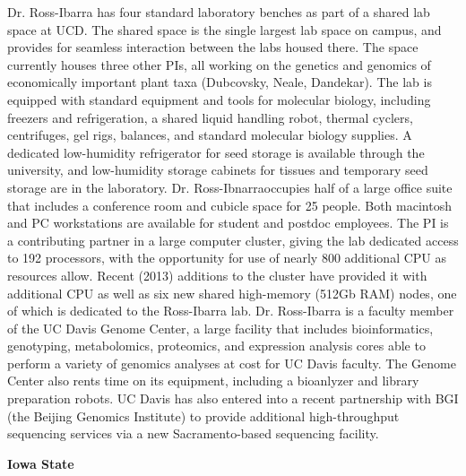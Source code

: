 Dr. Ross-Ibarra has four standard laboratory benches as part of a shared lab space at UCD.  The shared space is the single largest lab space on campus, and provides for seamless interaction between the labs housed there.  The space currently houses three other PIs, all working on the genetics and genomics of economically important plant taxa (Dubcovsky, Neale, Dandekar). The lab is equipped with standard equipment and tools for molecular biology, including freezers and refrigeration, a shared liquid handling robot, thermal cyclers, centrifuges, gel rigs, balances, and standard molecular biology supplies.  A dedicated low-humidity refrigerator for seed storage is available through the university, and low-humidity storage cabinets for tissues and temporary seed storage are in the laboratory. Dr. Ross-Ibnarraoccupies half of a large office suite that includes a conference room and cubicle space for 25 people.  Both macintosh and PC workstations are available for student and postdoc employees. The PI is a contributing partner in a large computer cluster, giving the lab dedicated access to 192 processors, with the opportunity for use of nearly 800 additional CPU as resources allow. Recent (2013) additions to the cluster have provided it with additional CPU as well as six new shared high-memory (512Gb RAM) nodes, one of which is dedicated to the Ross-Ibarra lab. Dr. Ross-Ibarra is a faculty member of the UC Davis Genome Center, a large facility that includes bioinformatics, genotyping, metabolomics, proteomics, and expression analysis cores able to perform a variety of genomics analyses at cost for UC Davis faculty. The Genome Center also rents time on its equipment, including a bioanlyzer and library preparation robots. UC Davis has also entered into a recent partnership with BGI (the Beijing Genomics Institute) to provide additional high-throughput sequencing services via a new Sacramento-based sequencing facility.

\textbf{Iowa State}


